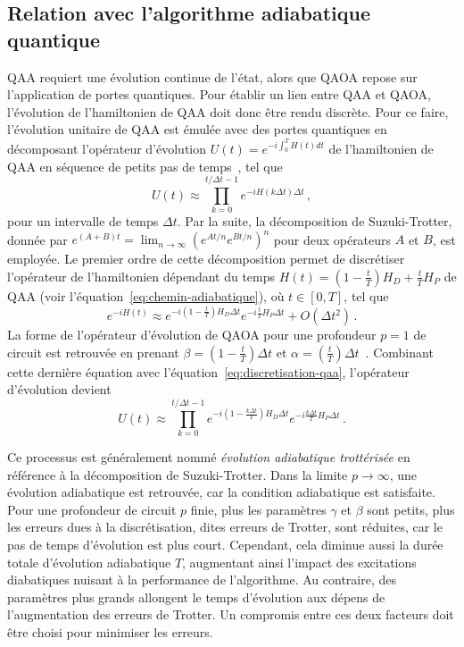
\subsection{Relation avec l'algorithme adiabatique quantique}
\label{subsec:discretisation-qaoa}

QAA requiert une évolution continue de l'état, alors que QAOA repose sur l'application de portes quantiques. Pour établir un lien entre QAA et QAOA, l'évolution de l'hamiltonien de QAA doit donc être rendu discrète. Pour ce faire, l'évolution unitaire de QAA est émulée avec des portes quantiques en décomposant l'opérateur d'évolution $U(t) = e^{-i \int_{0}^{T} H(t) dt}$ de l'hamiltonien de QAA en séquence de petits pas de temps~\cite{blekosReviewQuantumApproximate2024}, tel que
\begin{equation}
    \label{eq:discretisation-qaa}
    U(t) \approx \prod_{k=0}^{t / \Delta t -1} e^{-i H(k \Delta t) \Delta t} \,,
 \end{equation}
pour un intervalle de temps $\Delta t$. Par la suite, la décomposition de Suzuki-Trotter, donnée par $e^{(A+B)t} = \lim_{n \to \infty} (e^{At / n} e^{Bt / n})^{n}$ pour deux opérateurs $A$ et $B$, est employée. Le premier ordre de cette décomposition permet de discrétiser l'opérateur de l'hamiltonien dépendant du temps $H(t)=(1-\frac{t}{T})H_{D} + \frac{t}{T}H_{P}$ de QAA (voir l'équation~\ref{eq:chemin-adiabatique}), où $t \in [0, T]$, tel que
\begin{equation}
    e^{-i H(t) } \approx e^{-i (1 - \frac{t}{T}) H_D \Delta t} e^{-i \frac{t}{T} H_P \Delta t} + O(\Delta t^2) \,.
\end{equation}
La forme de l'opérateur d'évolution de QAOA pour une profondeur $p=1$ de circuit est retrouvée en prenant $\beta = (1 - \frac{t}{T}) \Delta t$ et $\alpha = (\frac{t}{T}) \Delta t$~\cite{sackQuantumAnnealingInitialization2021}. Combinant cette dernière équation avec l'équation~\ref{eq:discretisation-qaa}, l'opérateur d'évolution devient
\begin{equation}
    U(t) \approx \prod_{k=0}^{t / \Delta t -1} e^{-i (1 - \frac{k \Delta t}{T}) H_{D} \Delta t} e^{- i \frac{k \Delta t}{T} H_{P} \Delta t} \,.
 \end{equation}

 Ce processus est généralement nommé \textit{évolution adiabatique trottérisée} en référence à la décomposition de Suzuki-Trotter. Dans la limite $p \to \infty$, une évolution adiabatique est retrouvée, car la condition adiabatique est satisfaite. Pour une profondeur de circuit $p$ finie, plus les paramètres $\gamma$ et $\beta$ sont petits, plus les erreurs dues à la discrétisation, dites erreurs de Trotter, sont réduites, car le pas de temps d'évolution est plus court. Cependant, cela diminue aussi la durée totale d'évolution adiabatique $T$, augmentant ainsi l'impact des excitations diabatiques nuisant à la performance de l'algorithme. Au contraire, des paramètres plus grands allongent le temps d'évolution aux dépens de l'augmentation des erreurs de Trotter. Un compromis entre ces deux facteurs doit être choisi pour minimiser les erreurs.

